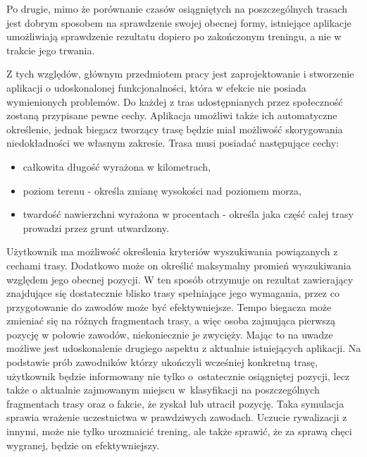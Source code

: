 Po drugie, mimo że porównanie czasów osiągniętych na poszczególnych trasach jest dobrym sposobem na sprawdzenie swojej obecnej formy, istniejące aplikacje umożliwiają sprawdzenie rezultatu dopiero po zakończonym treningu, a nie w trakcie jego trwania.

Z tych względów, głównym przedmiotem pracy jest zaprojektowanie i stworzenie aplikacji o udoskonalonej funkcjonalności, która w efekcie nie posiada wymienionych problemów. Do każdej z tras udostępnianych przez społeczność zostaną przypisane pewne cechy. Aplikacja umożliwi także ich automatyczne określenie, jednak biegacz tworzący trasę będzie miał możliwość skorygowania niedokładności we własnym zakresie. Trasa musi posiadać następujące cechy:
\begin{itemize}
\item całkowita długość wyrażona w kilometrach,
\item poziom terenu - określa zmianę wysokości nad poziomem morza,
\item twardość nawierzchni wyrażona w procentach - określa jaka część całej trasy prowadzi przez grunt utwardzony.
\end{itemize}
Użytkownik ma możliwość określenia kryteriów wyszukiwania powiązanych z cechami trasy. Dodatkowo może on określić maksymalny promień wyszukiwania względem jego obecnej pozycji. W ten sposób otrzymuje on rezultat zawierający znajdujące się dostatecznie blisko trasy spełniające jego wymagania, przez co przygotowanie do zawodów może być efektywniejsze. Tempo biegacza może zmieniać się na różnych fragmentach trasy, a więc osoba zajmująca pierwszą pozycję w połowie zawodów, niekoniecznie je zwycięży. Mając to na uwadze możliwe jest udoskonalenie drugiego aspektu z aktualnie istniejących aplikacji. Na podstawie prób zawodników którzy ukończyli wcześniej konkretną trasę, użytkownik będzie informowany nie tylko o~ostatecznie osiągniętej pozycji, lecz także o aktualnie zajmowanym miejscu w~klasyfikacji na poszczególnych fragmentach trasy oraz o fakcie, że zyskał lub utracił pozycję. Taka symulacja sprawia wrażenie uczestnictwa w prawdziwych zawodach. Uczucie rywalizacji z innymi, może nie tylko urozmaicić trening, ale także sprawić, że za sprawą chęci wygranej, będzie on efektywniejszy.

